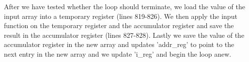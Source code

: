 After we have tested whether the loop should terminate, we load the value of the input array into a temporary register (lines 819-826). We then apply the input function on the temporary register and the accumulator register and save the result in the accumulator register (lines 827-828). Lastly we save the value of the accumulator register in the new array and updates 'addr\_reg' to point to the next entry in the new array and we update 'i\_reg' and begin the loop anew.